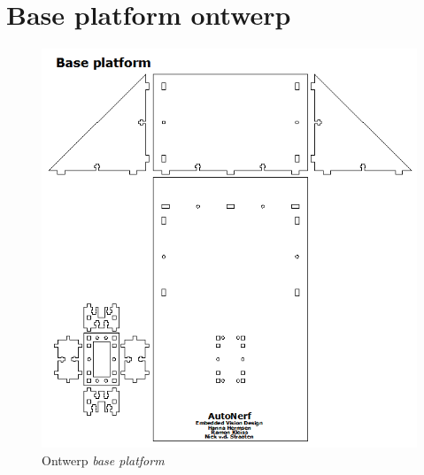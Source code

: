 \chapter{Base platform ontwerp}
\label{app:base-platform}

\begin{figure}
    \includegraphics[scale=0.5]{figures/appendix/base.png}
    \caption{Ontwerp \emph{base platform}}
\end{figure}
